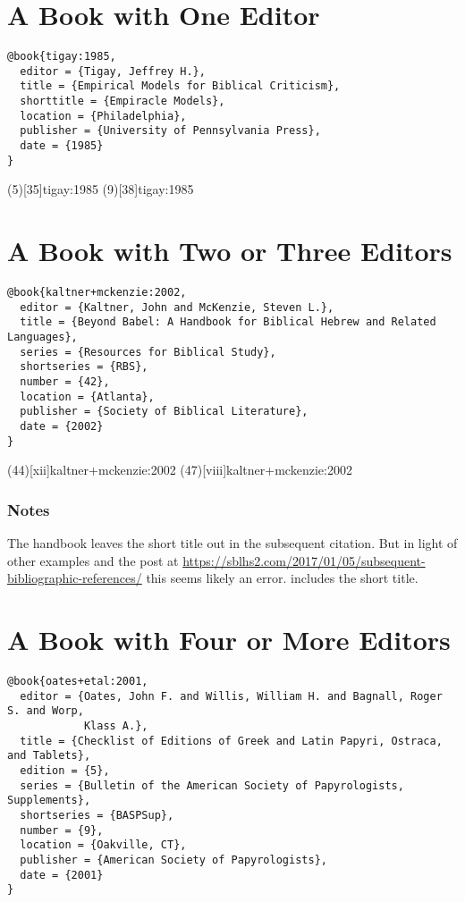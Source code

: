\documentclass[a4paper]{article}
\begin{document}
\section{A Book with One Editor}

\begin{verbatim}
@book{tigay:1985,
  editor = {Tigay, Jeffrey H.},
  title = {Empirical Models for Biblical Criticism},
  shorttitle = {Empiracle Models},
  location = {Philadelphia},
  publisher = {University of Pennsylvania Press},
  date = {1985}
}
\end{verbatim}

\examplecite(5)[35]{tigay:1985}
\examplecite(9)[38]{tigay:1985}
\examplebibliography

\section{A Book with Two or Three Editors}

\begin{verbatim}
@book{kaltner+mckenzie:2002,
  editor = {Kaltner, John and McKenzie, Steven L.},
  title = {Beyond Babel: A Handbook for Biblical Hebrew and Related Languages},
  series = {Resources for Biblical Study},
  shortseries = {RBS},
  number = {42},
  location = {Atlanta},
  publisher = {Society of Biblical Literature},
  date = {2002}
}
\end{verbatim}

\examplecite(44)[xii]{kaltner+mckenzie:2002}
\examplecite(47)[viii]{kaltner+mckenzie:2002}
\exampleabbreviations
\examplebibliography

\subsubsection{Notes}

The handbook leaves the short title out in the subsequent citation. But in
light of other examples and the post at
\url{https://sblhs2.com/2017/01/05/subsequent-bibliographic-references/} this
seems likely an error.  includes the short title.

\section{A Book with Four or More Editors}

\begin{verbatim}
@book{oates+etal:2001,
  editor = {Oates, John F. and Willis, William H. and Bagnall, Roger S. and Worp,
            Klass A.},
  title = {Checklist of Editions of Greek and Latin Papyri, Ostraca, and Tablets},
  edition = {5},
  series = {Bulletin of the American Society of Papyrologists, Supplements},
  shortseries = {BASPSup},
  number = {9},
  location = {Oakville, CT},
  publisher = {American Society of Papyrologists},
  date = {2001}
}
\end{verbatim}
\end{document}
